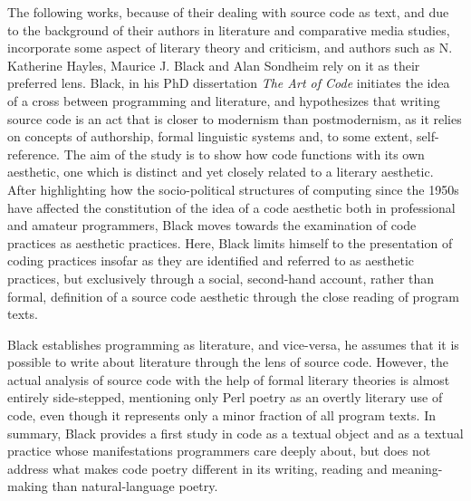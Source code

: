 The following works, because of their dealing with source code as text, and due to the background of their authors in literature and comparative media studies, incorporate some aspect of literary theory and criticism, and authors such as N. Katherine Hayles, Maurice J. Black and Alan Sondheim rely on it as their preferred lens. Black, in his PhD dissertation \emph{The Art of Code} \citep{black_art_2002} initiates the idea of a cross between programming and literature, and hypothesizes that writing source code is an act that is closer to modernism than postmodernism, as it relies on concepts of authorship, formal linguistic systems and, to some extent, self-reference. The aim of the study is to show how code functions with its own aesthetic, one which is distinct and yet closely related to a literary aesthetic. After highlighting how the socio-political structures of computing since the 1950s have affected the constitution of the idea of a code aesthetic both in professional and amateur programmers, Black moves towards the examination of code practices as aesthetic practices. Here, Black limits himself to the presentation of coding practices insofar as they are identified and referred to as aesthetic practices, but exclusively through a social, second-hand account, rather than formal, definition of a source code aesthetic through the close reading of program texts.

Black  establishes programming as literature, and vice-versa, he assumes that it is possible to write about literature through the lens of source code. However, the actual analysis of source code with the help of formal literary theories is almost entirely side-stepped, mentioning only Perl poetry as an overtly literary use of code, even though it represents only a minor fraction of all program texts. In summary, Black provides a first study in code as a textual object and as a textual practice whose manifestations programmers care deeply about, but does not address what makes code poetry different in its writing, reading and meaning-making than natural-language poetry.

